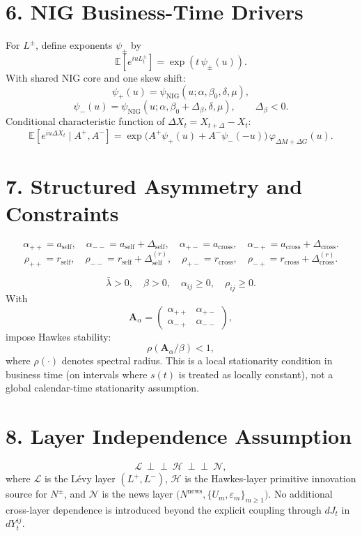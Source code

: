 \documentclass[11pt]{article}
\begin{document}
\section*{6. NIG Business-Time Drivers}
For \(L^\pm\), define exponents \(\psi_\pm\) by
\[
\mathbb{E}\!\left[e^{iuL_t^\pm}\right]=\exp\!\left(t\,\psi_\pm(u)\right).
\]
With shared NIG core and one skew shift:
\[
\psi_+(u)=\psi_{\mathrm{NIG}}(u;\alpha,\beta_0,\delta,\mu),
\]
\[
\psi_-(u)=\psi_{\mathrm{NIG}}(u;\alpha,\beta_0+\Delta_\beta,\delta,\mu),
\qquad
\Delta_\beta<0.
\]
Conditional characteristic function of \(\Delta X_t=X_{t+\Delta}-X_t\):
\[
\mathbb{E}\!\left[e^{iu\Delta X_t}\mid A^+,A^-\right]
=
\exp\!\Big(A^+\psi_+(u)+A^-\psi_-(-u)\Big)\,\varphi_{\Delta M+\Delta G}(u).
\]

\section*{7. Structured Asymmetry and Constraints}
\[
\alpha_{++}=a_{\mathrm{self}},
\quad
\alpha_{--}=a_{\mathrm{self}}+\Delta_{\mathrm{self}},
\quad
\alpha_{+-}=a_{\mathrm{cross}},
\quad
\alpha_{-+}=a_{\mathrm{cross}}+\Delta_{\mathrm{cross}}.
\]
\[
\rho_{++}=r_{\mathrm{self}},
\quad
\rho_{--}=r_{\mathrm{self}}+\Delta^{(r)}_{\mathrm{self}},
\quad
\rho_{+-}=r_{\mathrm{cross}},
\quad
\rho_{-+}=r_{\mathrm{cross}}+\Delta^{(r)}_{\mathrm{cross}}.
\]

\[
\bar{\lambda}>0,\quad
\beta>0,\quad
\alpha_{ij}\ge 0,\quad
\rho_{ij}\ge 0.
\]
With
\[
\mathbf{A}_{\alpha}=
\begin{pmatrix}
\alpha_{++} & \alpha_{+-}\\
\alpha_{-+} & \alpha_{--}
\end{pmatrix},
\]
impose Hawkes stability:
\[
\rho\!\left(\mathbf{A}_{\alpha}/\beta\right)<1,
\]
where \(\rho(\cdot)\) denotes spectral radius.
This is a local stationarity condition in business time (on intervals where \(s(t)\) is treated as locally constant), not a global calendar-time stationarity assumption.

\section*{8. Layer Independence Assumption}
\[
\mathcal{L}\ \perp\!\!\!\perp\ \mathcal{H}\ \perp\!\!\!\perp\ \mathcal{N},
\]
where \(\mathcal{L}\) is the Lévy layer \((L^+,L^-)\), \(\mathcal{H}\) is the Hawkes-layer primitive innovation source for \(N^\pm\), and \(\mathcal{N}\) is the news layer \(\big(N^{\mathrm{news}},\{U_m,\varepsilon_m\}_{m\ge1}\big)\).
No additional cross-layer dependence is introduced beyond the explicit coupling through \(dJ_t\) in \(dY_t^{ij}\).
\end{document}
